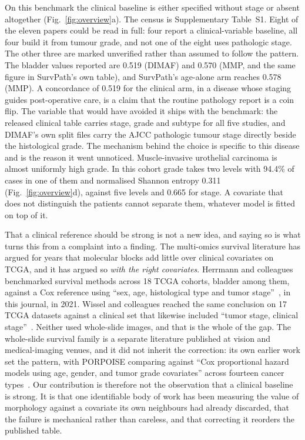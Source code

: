 \documentclass[unnumsec,webpdf,contemporary,large]{oup-authoring-template}
\begin{document}
On this benchmark the clinical baseline is either specified without stage or absent altogether
(Fig.~\ref{fig:overview}a). The census is Supplementary Table~S1. Eight of the eleven papers
could be read in full: four report a clinical-variable baseline, all four build it from tumour
grade, and not one of the eight uses pathologic stage. The other three are marked unverified
rather than assumed to follow the pattern. The bladder values reported are 0.519 (DIMAF) and 0.570 (MMP, and the same figure in
SurvPath's own table), and SurvPath's age-alone arm reaches 0.578 (MMP). A concordance of 0.519 for
the clinical arm, in a disease whose staging guides post-operative care, is a claim that the routine
pathology report is a coin flip. The variable that would have avoided it ships with the benchmark:
the released clinical table carries stage, grade and subtype for all five studies, and DIMAF's own
split files carry the AJCC pathologic tumour stage directly beside the histological grade. The
mechanism behind the choice is specific to this disease and is the reason it went unnoticed.
Muscle-invasive urothelial carcinoma is almost uniformly high grade. In this cohort grade
takes two levels with 94.4\% of cases in one of them and normalised Shannon entropy
0.311 (Fig.~\ref{fig:overview}d), against five levels and 0.665 for stage. A covariate
that does not distinguish the patients cannot separate them, whatever model is fitted on top of it.

That a clinical reference should be strong is not a new idea, and saying so is what turns this
from a complaint into a finding. The multi-omics survival literature has argued for years that
molecular blocks add little over clinical covariates on TCGA, and it has argued so \emph{with the
right covariates}. Herrmann and colleagues benchmarked survival methods across 18 TCGA cohorts,
bladder among them, against a Cox reference using ``sex, age, histological type and tumor
stage''~\citep{herrmann2021benchmark}, in this journal, in 2021. Wissel and colleagues reached the
same conclusion on 17 TCGA datasets against a clinical set that likewise included ``tumor stage,
clinical stage''~\citep{wissel2023noise}. Neither used whole-slide images, and that is the whole of
the gap. The whole-slide survival family is a separate literature published at vision and
medical-imaging venues, and it did not inherit the correction: its own earlier work set the
pattern, with PORPOISE comparing against ``Cox proportional hazard models using age, gender, and
tumor grade covariates'' across fourteen cancer types~\citep{chen2022porpoise}. Our contribution
is therefore not the observation that a clinical baseline is strong. It is that one identifiable
body of work has been measuring the value of morphology against a covariate its own neighbours had
already discarded, that the failure is mechanical rather than careless, and that correcting it
reorders the published table.
\end{document}
